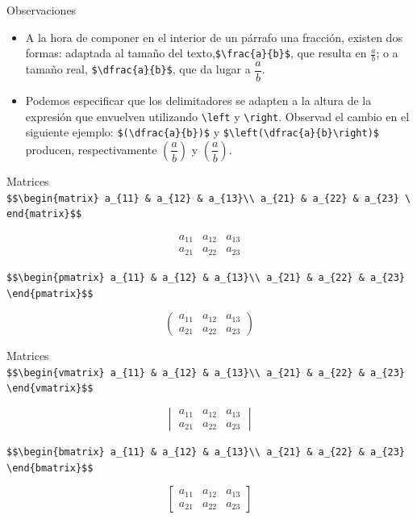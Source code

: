 \documentclass[
  ignorenonframetext,
]{beamer}
\begin{document}
\begin{frame}[fragile]{Observaciones}
\label{observaciones}
\begin{itemize}
\item
  A la hora de componer en el interior de un párrafo una fracción,
  existen dos formas: adaptada al tamaño del
  texto,\texttt{\$\textbackslash{}frac\{a\}\{b\}\$}, que resulta en
  \(\frac{a}{b}\); o a tamaño real,
  \texttt{\$\textbackslash{}dfrac\{a\}\{b\}\$}, que da lugar a
  \(\dfrac{a}{b}\).
\item
  Podemos especificar que los delimitadores se adapten a la altura de la
  expresión que envuelven utilizando \texttt{\textbackslash{}left} y
  \texttt{\textbackslash{}right}. Observad el cambio en el siguiente
  ejemplo: \texttt{\$(\textbackslash{}dfrac\{a\}\{b\})\$} y
  \texttt{\$\textbackslash{}left(\textbackslash{}dfrac\{a\}\{b\}\textbackslash{}right)\$}
  producen, respectivamente \((\dfrac{a}{b})\) y
  \(\left(\dfrac{a}{b}\right)\).
\end{itemize}
\end{frame}

\begin{frame}[fragile]{Matrices}
\label{matrices}
\texttt{\$\$\textbackslash{}begin\{matrix\}\ a\_\{11\}\ \&\ a\_\{12\}\ \&\ a\_\{13\}\textbackslash{}\textbackslash{}\ a\_\{21\}\ \&\ a\_\{22\}\ \&\ a\_\{23\}\ \textbackslash{}end\{matrix\}\$\$}

\[\begin{matrix}
a_{11} & a_{12} & a_{13}\\
a_{21} & a_{22} & a_{23}
\end{matrix}\]

\texttt{\$\$\textbackslash{}begin\{pmatrix\}\ a\_\{11\}\ \&\ a\_\{12\}\ \&\ a\_\{13\}\textbackslash{}\textbackslash{}\ a\_\{21\}\ \&\ a\_\{22\}\ \&\ a\_\{23\}\ \textbackslash{}end\{pmatrix\}\$\$}

\[\begin{pmatrix}
a_{11} & a_{12} & a_{13}\\
a_{21} & a_{22} & a_{23}
\end{pmatrix}\]
\end{frame}

\begin{frame}[fragile]{Matrices}
\label{matrices-1}
\texttt{\$\$\textbackslash{}begin\{vmatrix\}\ a\_\{11\}\ \&\ a\_\{12\}\ \&\ a\_\{13\}\textbackslash{}\textbackslash{}\ a\_\{21\}\ \&\ a\_\{22\}\ \&\ a\_\{23\}\ \textbackslash{}end\{vmatrix\}\$\$}

\[\begin{vmatrix}
a_{11} & a_{12} & a_{13}\\
a_{21} & a_{22} & a_{23}
\end{vmatrix}\]

\texttt{\$\$\textbackslash{}begin\{bmatrix\}\ a\_\{11\}\ \&\ a\_\{12\}\ \&\ a\_\{13\}\textbackslash{}\textbackslash{}\ a\_\{21\}\ \&\ a\_\{22\}\ \&\ a\_\{23\}\ \textbackslash{}end\{bmatrix\}\$\$}

\[\begin{bmatrix}
a_{11} & a_{12} & a_{13}\\
a_{21} & a_{22} & a_{23}
\end{bmatrix}\]
\end{frame}
\end{document}
